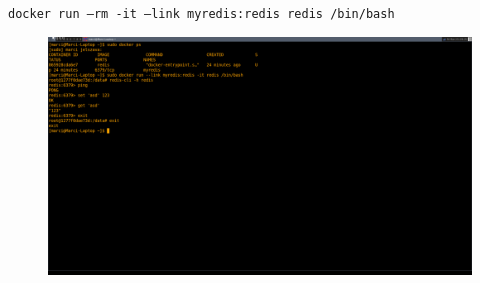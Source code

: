 \documentclass[]{article}
\numberwithin{equation}{section}
\begin{document}
\texttt{docker run --rm -it --link myredis:redis redis /bin/bash}

\begin{figure}
	\centering
	\includegraphics[width=0.7\linewidth]{redis.png}
	\caption{}
	\label{fig:redis}
\end{figure}
\end{document}
